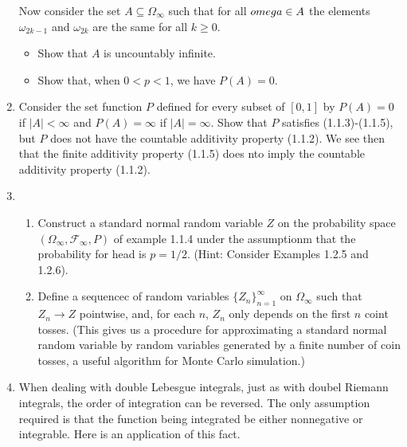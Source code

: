 \documentclass{article}
\newcommand{\F}{\mathcal{F}}
\begin{document}
\begin{enumerate}
	Now consider the set $A \subseteq \Omega_\infty$ such that for all $\\omega \in A$ the elements $\omega_{2k - 1}$ and $\omega_{2k}$ are the same for all $k \geq 0$.
		\begin{itemize}
			\item Show that $A$ is uncountably infinite.
			\item Show that, when $0 < p < 1$, we have $P(A) = 0$.
		\end{itemize}
	\item Consider the set function $P$ defined for every subset of $[0, 1]$ by $P(A) = 0$ if $|A| < \infty$ and $P(A) = \infty$ if $|A| = \infty$. Show that $P$ satisfies (1.1.3)-(1.1.5), but $P$ does not have the countable additivity property (1.1.2). We see then that the finite additivity property (1.1.5) does nto imply the countable additivity property (1.1.2).
	\item
		\begin{enumerate}
			\item Construct a standard normal random variable $Z$ on the probability space $(\Omega_\infty, \F_\infty, P)$ of example 1.1.4 under the assumptionm that the probability for head is $p = 1 / 2$. (Hint: Consider Examples 1.2.5 and 1.2.6).
			\item Define a sequencec of random variables $\{Z_n\}_{n = 1}^\infty$ on $\Omega_\infty$ such that $Z_n \rightarrow Z$ pointwise, and, for each $n$, $Z_n$ only depends on the first $n$ coint tosses. (This gives us a procedure for approximating a standard normal random variable by random variables generated by a finite number of coin tosses, a useful algorithm for Monte Carlo simulation.)
		\end{enumerate}
	\item When dealing with double Lebesgue integrals, just as with doubel Riemann integrals, the order of integration can be reversed. The only assumption required is that the function being integrated be either nonnegative or integrable. Here is an application of this fact.


\end{enumerate}
\end{document}
